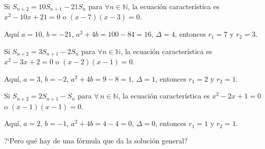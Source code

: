 \begin{example}{}
Si $S_{n+2}=10S_{n+1}-21S_n$ para $\forall n\in\mathds{N}$, la ecuación característica es $x^{2}-10x+21=0$ o $(x-7)(x-3)=0$.

Aquí $a=10$, $b=-21$, $a^2+4b=100-84=16$, $\Delta = 4$, entonces $r_{1}=7$ y $r_{2}=3$.
\end{example}

\begin{example}{}
Si $S_{n+2} = 3S_{n+1}-2S_{n}$ para $\forall n\in\mathds{N}$, la ecuación característica es $x^{2}-3x+2=0$ o $(x-2)(x-1)=0$.

Aquí, $a=3$, $b=-2$, $a^{2}+4b=9-8=1$, $\Delta = 1$, entonces $r_{1}=2$ y $r_{2}=1$.
\end{example}

\begin{example}{}
Si $S_{n+2}=2S_{n+1}-S_{n}$ para $\forall\,n\in\mathds{N}$, la ecuación característica es $x^{2}-2x+1=0$ o $(x-1)(x-1)=0$.

Aquí, $a=2$, $b=-1$, $a^2+4b=4-4=0$, $\Delta = 0$, entonces $r_{1}=1$ y $r_{2}=1$.
\end{example}

?`Pero qué hay de una fórmula que da la solución general?

